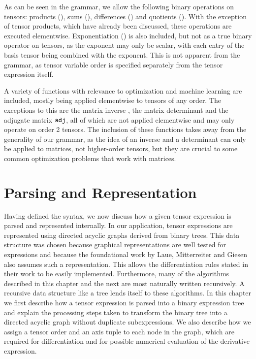 \documentclass[12pt, a4paper]{report}
\begin{document}
As can be seen in the grammar, we allow the following binary operations on tensors: products (\codeword{*(,->)}), sums (\codeword{+}), differences (\codeword{-}) and quotients (\codeword{/}).
With the exception of tensor products, which have already been discussed, these operations are executed elementwise.
Exponentiation (\codeword{^}) is also included, but not as a true binary operator on tensors, as the exponent may only be scalar, with each entry of the basis tensor being combined with the exponent.
This is not apparent from the grammar, as tensor variable order is specified separately from the tensor expression itself.

A variety of functions with relevance to optimization and machine learning are included, mostly being applied elementwise to tensors of any order.
The exceptions to this are the matrix inverse , the matrix determinant  and the adjugate matrix $\codeword{adj}$, all of which are not applied elementwise and may only operate on order 2 tensors.
The inclusion of these functions takes away from the generality of our grammar, as the idea of an inverse and a determinant can only be applied to matrices, not higher-order tensors, but they are crucial to some common optimization problems that work with matrices.

\chapter{Parsing and Representation}
Having defined the syntax, we now discuss how a given tensor expression is parsed and represented internally.
In our application, tensor expressions are represented using directed acyclic graphs derived from binary trees.
This data structure was chosen because graphical representations are well tested for expressions and because the foundational work by Laue, Mitterreiter and Giesen also assumes such a representation.
This allows the differentiation rules stated in their work to be easily implemented.
Furthermore, many of the algorithms described in this chapter and the next are most naturally written recursively.
A recursive data structure like a tree lends itself to these algorithms.
In this chapter we first describe how a tensor expression is parsed into a binary expression tree and explain the processing steps taken to transform the binary tree into a directed acyclic graph without duplicate subexpressions.
We also describe how we assign a tensor order and an axis tuple to each node in the graph, which are required for differentiation and for possible numerical evaluation of the derivative expression.
\end{document}
